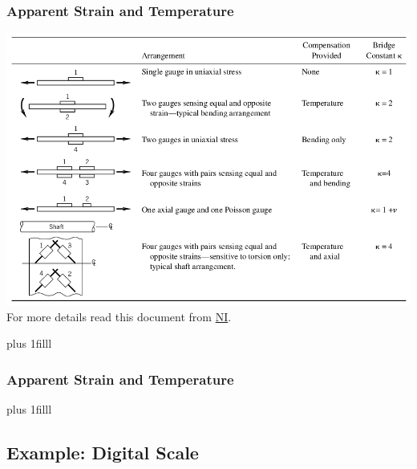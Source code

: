\documentclass[fleqn]{beamer} %
\newcommand{\sectionIIsubsectionIIItitle}{Apparent Strain and Temperature}
\newcommand{\sectionIIsubsectionIVtitle}{Example: Digital Scale}
\newcommand{\btVFill}{\vskip0pt plus 1filll}
\begin{document}
			\begin{frame}
				\frametitle{\sectionIIsubsectionIIItitle}

				\bigskip

				\includegraphics[scale=.28]{images/gauge_configurations.png}\\
For more details read this document from \href{https://www.ni.com/en-us/innovations/white-papers/07/measuring-strain-with-strain-gages.html}{NI}.


				\btVFill
			
			\end{frame}

			\begin{frame}
			\frametitle{\sectionIIsubsectionIIItitle}




				\btVFill

			\end{frame}

		\subsection{\sectionIIsubsectionIVtitle}\label{sectionIIsubsectionIV}
\end{document}

